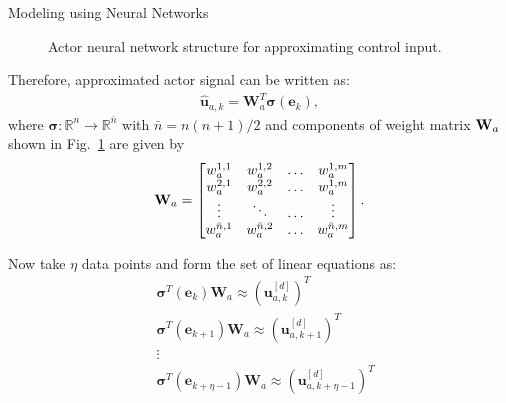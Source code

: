 \documentclass{beamer}
\begin{document}
\begin{frame}{Modeling using Neural Networks}{}
\begin{figure}
    \caption{Actor neural network structure for approximating control input.}
    \label{fig:nnActor}
		\end{figure}
\end{frame}

\begin{frame}

  Therefore, approximated actor signal can be written as:
\begin{align}
  \label{eq:approximatePolicyActorWeights}
    \hat{\mathbf{u}}_{a,k} = \mathbf{W}_a^T\bm{\sigma}(\mathbf{e}_k),
  \end{align}
%
where $\bm{\sigma}:\mathbb{R}^n\to\mathbb{R}^{\bar{n}}$ with $\bar{n} = n(n+1)/2$ and components of weight matrix ${\bf W}_a$ shown in Fig.~\ref{fig:nnActor} are given by %
%
\begin{align*}
  {\bf W}_a = 
  \begin{bmatrix}
    w_a^{1,1} &  w_a^{1,2} & \ldots &w_a^{1,m}\\
    w_a^{2,1} & w_a^{2,2}& \ldots &w_a^{1,m}\\
    \vdots & \ddots & \ldots &\vdots\\
    w_a^{\bar{n},1} & w_a^{\bar{n},2}& \ldots &w_a^{\bar{n},m}
  \end{bmatrix}.
\end{align*}
%

Now take $\eta$ data points and form the set of linear equations as: %
%
\begin{align*}
&  \bm{\sigma}^T(\mathbf{e}_k) \mathbf{W}_a  \approx     \left(\mathbf{u}_{a,k}^{[d]}\right)^T\\
 & \bm{\sigma}^T(\mathbf{e}_{k+1}) \mathbf{W}_a  \approx     \left(\mathbf{u}_{a,k+1}^{[d]}\right)^T\\
                                            &\vdots \\
 & \bm{\sigma}^T(\mathbf{e}_{k+\eta-1}) \mathbf{W}_a  \approx     \left(\mathbf{u}_{a,k+\eta-1}^{[d]}\right)^T  
\end{align*}
%
\end{frame}
\end{document}
